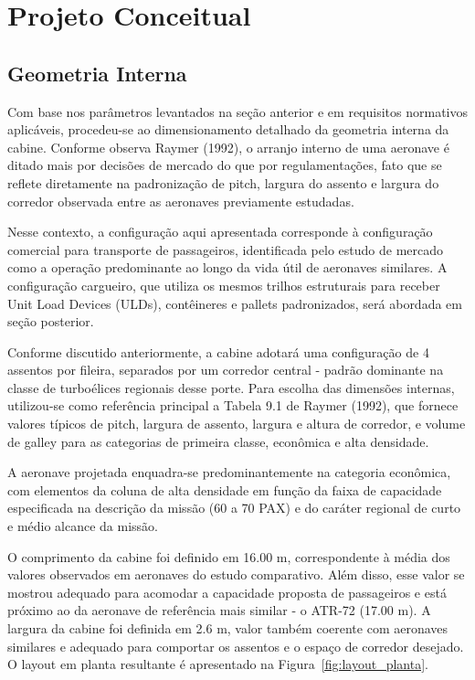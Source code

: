 \chapter{Projeto Conceitual}
\section{Geometria Interna}
Com base nos parâmetros levantados na seção anterior e em requisitos normativos aplicáveis, procedeu-se ao dimensionamento detalhado da geometria interna da cabine. Conforme observa Raymer (1992), o arranjo interno de uma aeronave é ditado mais por decisões de mercado do que por regulamentações, fato que se reflete diretamente na padronização de pitch, largura do assento e largura do corredor observada entre as aeronaves previamente estudadas.

Nesse contexto, a configuração aqui apresentada corresponde à configuração comercial para transporte de passageiros, identificada pelo estudo de mercado como a operação predominante ao longo da vida útil de aeronaves similares. A configuração cargueiro, que utiliza os mesmos trilhos estruturais para receber Unit Load Devices (ULDs), contêineres e pallets padronizados, será abordada em seção posterior.

Conforme discutido anteriormente, a cabine adotará uma configuração de 4 assentos por fileira, separados por um corredor central - padrão dominante na classe de turboélices regionais desse porte. Para escolha das dimensões internas, utilizou-se como referência principal a Tabela 9.1 de Raymer (1992), que fornece valores típicos de pitch, largura de assento, largura e altura de corredor, e volume de galley para as categorias de primeira classe, econômica e alta densidade.

A aeronave projetada enquadra-se predominantemente na categoria econômica, com elementos da coluna de alta densidade em função da faixa de capacidade especificada na descrição da missão (60 a 70 PAX) e do caráter regional de curto e médio alcance da missão.

O comprimento da cabine foi definido em 16.00 m, correspondente à média dos valores observados em aeronaves do estudo comparativo. Além disso, esse valor se mostrou adequado para acomodar a capacidade proposta de passageiros e está próximo ao da aeronave de referência mais similar - o ATR-72 (17.00 m). A largura da cabine foi definida em 2.6 m, valor também coerente com aeronaves similares e adequado para comportar os assentos e o espaço de corredor desejado. O layout em planta resultante é apresentado na Figura~\ref{fig:layout_planta}.

